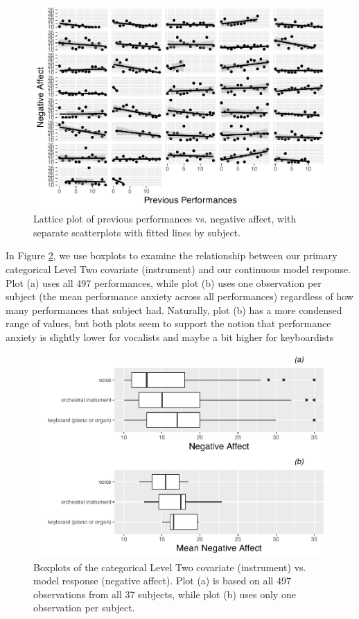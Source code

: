 \documentclass[
]{krantz}
\begin{document}
\begin{figure}

{\centering \includegraphics[width=0.6\linewidth]{bookdown-BeyondMLR_files/figure-latex/mli-lattice3-1} 

}

\caption{Lattice plot of previous performances vs. negative affect, with separate scatterplots with fitted lines by subject.}\label{fig:mli-lattice3}
\end{figure}

In Figure \ref{fig:mli-boxmat1}, we use boxplots to examine the relationship between our primary categorical Level Two covariate (instrument) and our continuous model response. Plot (a) uses all 497 performances, while plot (b) uses one observation per subject (the mean performance anxiety across all performances) regardless of how many performances that subject had. Naturally, plot (b) has a more condensed range of values, but both plots seem to support the notion that performance anxiety is slightly lower for vocalists and maybe a bit higher for keyboardists

\begin{figure}

{\centering \includegraphics[width=0.6\linewidth]{bookdown-BeyondMLR_files/figure-latex/mli-boxmat1-1} 

}

\caption{Boxplots of the categorical Level Two covariate (instrument) vs. model response (negative affect).  Plot (a) is based on all 497 observations from all 37 subjects, while plot (b) uses only one observation per subject.}\label{fig:mli-boxmat1}
\end{figure}
\end{document}
